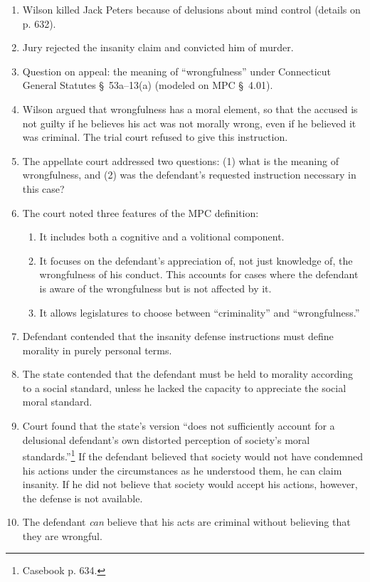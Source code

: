\begin{enumerate}
    \item Wilson killed Jack Peters because of delusions about mind control (details on p. 632).
    \item Jury rejected the insanity claim and convicted him of murder. 
    \item Question on appeal: the meaning of ``wrongfulness'' under Connecticut General Statutes § 53a--13(a) (modeled on MPC § 4.01).
    \item Wilson argued that wrongfulness has a moral element, so that the accused is not guilty if he believes his act was not morally wrong, even if he believed it was criminal. The trial court refused to give this instruction.
    \item The appellate court addressed two questions: (1) what is the meaning of wrongfulness, and (2) was the defendant's requested instruction necessary in this case?
    \item The court noted three features of the MPC definition:
    \begin{enumerate}
        \item It includes both a cognitive and a volitional component.
        \item It focuses on the defendant's appreciation of, not just knowledge of, the wrongfulness of his conduct. This accounts for cases where the defendant is aware of the wrongfulness but is not affected by it.
        \item It allows legislatures to choose between ``criminality'' and ``wrongfulness.''
    \end{enumerate}
    \item Defendant contended that the insanity defense instructions must define morality in purely personal terms.
    \item The state contended that the defendant must be held to morality according to a social standard, unless he lacked the capacity to appreciate the social moral standard.
    \item Court found that the state's version ``does not sufficiently account for a delusional defendant's own distorted perception of society's moral standards.''\footnote{Casebook p. 634.} If the defendant believed that society would not have condemned his actions under the circumstances as he understood them, he can claim insanity. If he did not believe that society would accept his actions, however, the defense is not available.
    \item The defendant \emph{can} believe that his acts are criminal without believing that they are wrongful.

\end{enumerate}
